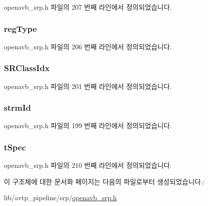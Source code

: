 openavb\+\_\+srp.\+h 파일의 207 번째 라인에서 정의되었습니다.

\subsubsection[{\texorpdfstring{reg\+Type}{regType}}]{ reg\+Type}\hypertarget{structopenavb_srp_strm_a1d02359d793a1e3b15326aa32a45af02}{}\label{structopenavb_srp_strm_a1d02359d793a1e3b15326aa32a45af02}


openavb\+\_\+srp.\+h 파일의 206 번째 라인에서 정의되었습니다.

\subsubsection[{\texorpdfstring{S\+R\+Class\+Idx}{SRClassIdx}}]{ S\+R\+Class\+Idx}\hypertarget{structopenavb_srp_strm_a0cacd3a7dd55c91ca8a384f337b2cd5e}{}\label{structopenavb_srp_strm_a0cacd3a7dd55c91ca8a384f337b2cd5e}


openavb\+\_\+srp.\+h 파일의 201 번째 라인에서 정의되었습니다.

\subsubsection[{\texorpdfstring{strm\+Id}{strmId}}]{ strm\+Id}\hypertarget{structopenavb_srp_strm_ae42f768866b4707b89a0d43f45bbf41e}{}\label{structopenavb_srp_strm_ae42f768866b4707b89a0d43f45bbf41e}


openavb\+\_\+srp.\+h 파일의 199 번째 라인에서 정의되었습니다.

\subsubsection[{\texorpdfstring{t\+Spec}{tSpec}}]{ t\+Spec}\hypertarget{structopenavb_srp_strm_ab928eca0e7b010a8cc3a80be5bc8adcc}{}\label{structopenavb_srp_strm_ab928eca0e7b010a8cc3a80be5bc8adcc}


openavb\+\_\+srp.\+h 파일의 210 번째 라인에서 정의되었습니다.



이 구조체에 대한 문서화 페이지는 다음의 파일로부터 생성되었습니다.\+:\begin{DoxyCompactItemize}
\item 
lib/avtp\+\_\+pipeline/srp/\hyperlink{openavb__srp_8h}{openavb\+\_\+srp.\+h}\end{DoxyCompactItemize}
